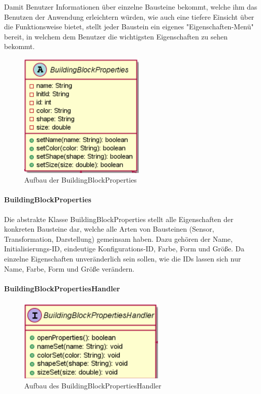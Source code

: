 \documentclass[parskip=full]{scrartcl}
\begin{document}
Damit Benutzer Informationen über einzelne Bausteine bekommt, welche ihm das Benutzen der Anwendung erleichtern würden, wie auch eine tiefere Einsicht über die Funktionsweise bietet, stellt jeder Baustein ein eigenes "Eigenschaften-Menü" bereit, in welchem dem Benutzer die wichtigsten Eigenschaften zu sehen bekommt.

\clearpage

\begin{figure}[htbp]
	\begin{center}
		\includegraphics[width = 6cm]{Grafiken/View/BuildingBlockProperties.PNG}
		\caption{Aufbau der BuildingBlockProperties}
		\label{Entwurf_Grob}
	\end{center}
\end{figure}

\paragraph{BuildingBlockProperties}

Die abstrakte Klasse BuildingBlockProperties stellt alle Eigenschaften der konkreten Bausteine dar, welche alle Arten von Bausteinen (Sensor, Transformation, Darstellung) gemeinsam haben. Dazu gehören der Name,  Initialisierungs-ID, eindeutige Konfigurations-ID, Farbe, Form und Größe. Da einzelne Eigenschaften unveränderlich sein sollen, wie die IDs lassen sich nur Name, Farbe, Form und Größe verändern.

\paragraph{BuildingBlockPropertiesHandler}

\begin{figure}[htbp]
	\begin{center}
		\includegraphics[width = 7cm]{Grafiken/View/BuildingBlockPropertiesHandler.PNG}
		\caption{Aufbau des BuildingBlockPropertiesHandler}
		\label{Entwurf_Grob}
	\end{center}
\end{figure}
\end{document}
